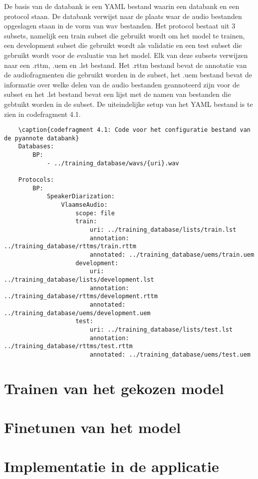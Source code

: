 De basis van de databank is een YAML bestand waarin een databank en een protocol staan. De databank verwijst naar de plaats waar de audio bestanden opgeslagen staan in de vorm van wav bestanden. Het protocol bestaat uit 3 subsets, namelijk een train subset die gebruikt wordt om het model te trainen, een development subset die gebruikt wordt als validatie en een test subset die gebruikt wordt voor de evaluatie van het model. Elk van deze subsets verwijzen naar een .rttm, .uem en .lst bestand. Het .rttm bestand bevat de annotatie van de audiofragmenten die gebruikt worden in de subset, het .uem bestand bevat de informatie over welke delen van de audio bestanden geannoteerd zijn voor de subset en het .lst bestand bevat een lijst met de namen van bestanden die gebtuikt worden in de subset. De uiteindelijke setup van het YAML bestand is te zien in codefragment 4.1.

\begin{verbatim}
	\caption{codefragment 4.1: Code voor het configuratie bestand van de pyannote databank}
	Databases:
		BP: 
			- ../training_database/wavs/{uri}.wav
	
	Protocols:
		BP:
			SpeakerDiarization:
				VlaamseAudio:
					scope: file
					train:
						uri: ../training_database/lists/train.lst
						annotation: ../training_database/rttms/train.rttm
						annotated: ../training_database/uems/train.uem
					development:
						uri: ../training_database/lists/development.lst
						annotation: ../training_database/rttms/development.rttm
						annotated: ../training_database/uems/development.uem
					test:
						uri: ../training_database/lists/test.lst
						annotation: ../training_database/rttms/test.rttm
						annotated: ../training_database/uems/test.uem
\end{verbatim}


\section{Trainen van het gekozen model}
\label{sec:trainen}


\section{Finetunen van het model}
\label{sec:finetunen}


\section{Implementatie in de applicatie}
\label{sec:implementatie}
